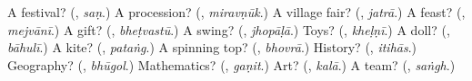 \begin{tcolorbox}[breakable,colback=teal!4,colframe=teal!35!black,title={Before you move on}]
A festival? (\textbf{}, \emph{saṇ}.) A procession? (\textbf{}, \emph{miravṇūk}.) A village fair? (\textbf{}, \emph{jatrā}.) A feast? (\textbf{}, \emph{mejvānī}.) A gift? (\textbf{}, \emph{bheṭvastū}.) A swing? (\textbf{}, \emph{jhopāḷā}.) Toys? (\textbf{}, \emph{kheḷṇī}.) A doll? (\textbf{}, \emph{bāhulī}.) A kite? (\textbf{}, \emph{pataṅg}.) A spinning top? (\textbf{}, \emph{bhovrā}.) History? (\textbf{}, \emph{itihās}.) Geography? (\textbf{}, \emph{bhūgol}.) Mathematics? (\textbf{}, \emph{gaṇit}.) Art? (\textbf{}, \emph{kalā}.) A team? (\textbf{}, \emph{saṅgh}.)
\end{tcolorbox}
